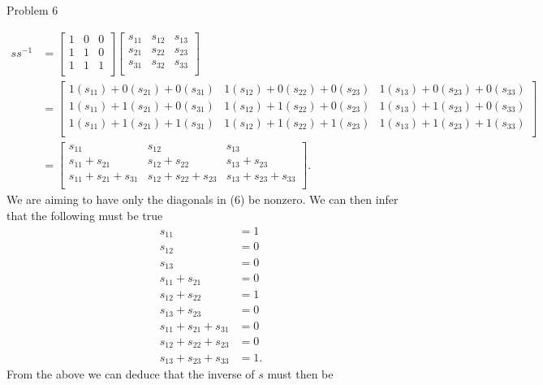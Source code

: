 \begin{problem}{Problem 6}
\begin{Highlight}[Solution]
        \begin{align}
            ss^{-1} & = 
            \begin{bmatrix}
                1 & 0 & 0 \\
                1 & 1 & 0 \\
                1 & 1 & 1 \\
            \end{bmatrix}
            \begin{bmatrix}
                s_{11} & s_{12} & s_{13} \\
                s_{21} & s_{22} & s_{23} \\
                s_{31} & s_{32} & s_{33} \\
            \end{bmatrix} \\
            & = 
            \begin{bmatrix}
                1(s_{11}) + 0(s_{21}) + 0(s_{31}) & 1(s_{12}) + 0(s_{22}) + 0(s_{23}) & 1(s_{13}) + 0(s_{23}) + 0(s_{33}) \\
                1(s_{11}) + 1(s_{21}) + 0(s_{31}) & 1(s_{12}) + 1(s_{22}) + 0(s_{23}) & 1(s_{13}) + 1(s_{23}) + 0(s_{33}) \\
                1(s_{11}) + 1(s_{21}) + 1(s_{31}) & 1(s_{12}) + 1(s_{22}) + 1(s_{23}) & 1(s_{13}) + 1(s_{23}) + 1(s_{33}) \\
            \end{bmatrix} \\
            & = 
            \begin{bmatrix}
                s_{11} & s_{12} & s_{13} \\
                s_{11} + s_{21} & s_{12} + s_{22} & s_{13} + s_{23} \\
                s_{11} + s_{21} + s_{31} & s_{12} + s_{22} + s_{23} & s_{13} + s_{23} + s_{33} \\
            \end{bmatrix}.
        \end{align}
        We are aiming to have only the diagonals in (6) be nonzero. We can then infer that the following must be true
        \begin{align*}
            s_{11} & = 1 \\
            s_{12} & = 0 \\
            s_{13} & = 0 \\
            s_{11} + s_{21} & = 0 \\
            s_{12} + s_{22} & = 1 \\
            s_{13} + s_{23} & = 0 \\
            s_{11} + s_{21} + s_{31} & = 0 \\
            s_{12} + s_{22} + s_{23} & = 0 \\
            s_{13} + s_{23} + s_{33} & = 1.
        \end{align*}
        From the above we can deduce that the inverse of $s$ must then be


\end{Highlight}
\end{problem}
